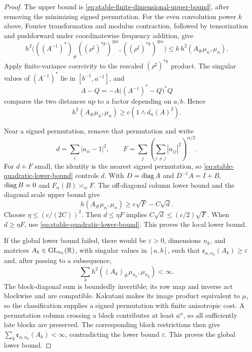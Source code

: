 \begin{proof}
The upper bound is \eqref{eq:stable-finite-dimensional-upper-bound}, after
removing the minimizing signed permutation.
For the even convolution power \(k\) above, Fourier transformation and modulus
contraction, followed by tensorization and pushforward under coordinatewise
frequency addition, give
\begin{equation}
 h^2\bigl(((A^{-1})^*)_\#((\rho^\sharp)^{*k})^{\otimes n},
                 ((\rho^\sharp)^{*k})^{\otimes n}\bigr)
 \le k\,h^2(A_\#\mu_n,\mu_n).
\end{equation}
Apply finite-variance coercivity to the rescaled \((\rho^\sharp)^{*k}\) product.  The
singular values of
\((A^{-1})^*\) lie in \([b^{-1},a^{-1}]\), and
\[
 A-Q=-A\bigl((A^{-1})^*-Q\bigr)^*Q
\]
compares the two distances up to a factor depending on \(a,b\).  Hence
\begin{equation}
 h^2(A_\#\mu_n,\mu_n)
 \ge c(1\wedge d_n(A)^2).
 \label{eq:stable-quadratic-lower-bound}
\end{equation}

Near a signed permutation, remove that permutation and write
\[
 d=\sum_i|a_{ii}-1|^2,
 \qquad
 F=\sum_j\left(\sum_{i\ne j}|a_{ij}|^2\right)^{\alpha/2}.
\]
For \(d+F\) small, the identity is the nearest signed
permutation, so \eqref{eq:stable-quadratic-lower-bound} controls
\(d\).  With \(D=\operatorname{diag} A\) and \(D^{-1}A=I+B\),
\(\operatorname{diag} B=0\) and \(F_\alpha(B)\asymp_\alpha F\).
The off-diagonal column lower bound and the diagonal scale upper bound give
\[
 h(A_\#\mu_n,\mu_n)
 \ge c\sqrt F-C\sqrt{d}.
\]
Choose \(\eta\le(c/(2C))^2\).  Then
\(d\le\eta F\) implies
\(C\sqrt{d}\le(c/2)\sqrt F\).  When
$d\ge\eta F$, use
\eqref{eq:stable-quadratic-lower-bound}.  This proves the local lower bound.

If the global lower bound failed, there would be \(\varepsilon>0\), dimensions
\(n_k\), and matrices \(A_k\in\operatorname{GL}_{n_k}(\mathbb R)\), with singular values in \([a,b]\),
such that \(\mathfrak e_{\alpha,n_k}(A_k)\ge\varepsilon\) and, after passing to
a subsequence,
\[
 \sum_k h^2((A_k)_\#\mu_{n_k},\mu_{n_k})<\infty.
\]
The block-diagonal sum is boundedly invertible; its row map and inverse act
blockwise and are compatible.  Kakutani makes its image product equivalent to
\(\mu\), so the classification supplies a signed
permutation with finite anisotropic cost.  A permutation column crossing a
block contributes at least \(a^\alpha\), so all sufficiently late blocks are
preserved.  The corresponding block restrictions then give
\(\sum_k\mathfrak e_{\alpha,n_k}(A_k)<\infty\), contradicting the lower bound
\(\varepsilon\).  This proves the global lower bound.
\end{proof}

